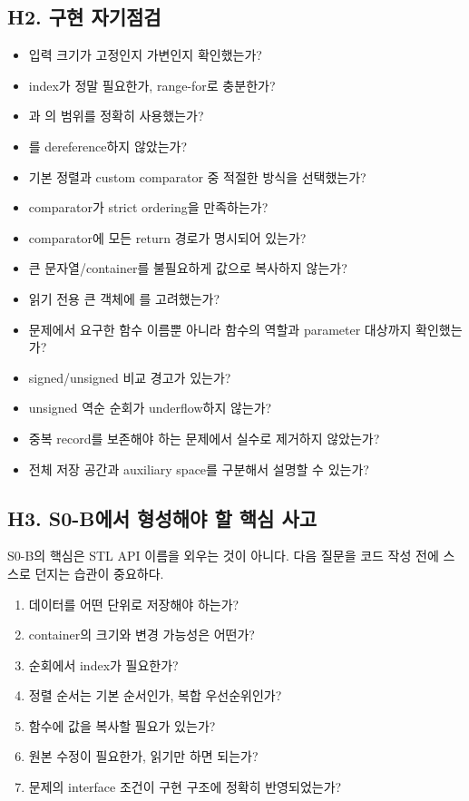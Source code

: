 \subsection{H2. 구현 자기점검}
\begin{checklistbox}[S0-B 코드 작성 후 체크리스트]
\begin{itemize}
  \item[$\square$] 입력 크기가 고정인지 가변인지 확인했는가?
  \item[$\square$] index가 정말 필요한가, range-for로 충분한가?
  \item[$\square$] 과 의 범위를 정확히 사용했는가?
  \item[$\square$] 를 dereference하지 않았는가?
  \item[$\square$] 기본 정렬과 custom comparator 중 적절한 방식을 선택했는가?
  \item[$\square$] comparator가 strict ordering을 만족하는가?
  \item[$\square$] comparator에 모든 return 경로가 명시되어 있는가?
  \item[$\square$] 큰 문자열/container를 불필요하게 값으로 복사하지 않는가?
  \item[$\square$] 읽기 전용 큰 객체에 를 고려했는가?
  \item[$\square$] 문제에서 요구한 함수 이름뿐 아니라 함수의 역할과 parameter 대상까지 확인했는가?
  \item[$\square$] signed/unsigned 비교 경고가 있는가?
  \item[$\square$] unsigned 역순 순회가 underflow하지 않는가?
  \item[$\square$] 중복 record를 보존해야 하는 문제에서 실수로 제거하지 않았는가?
  \item[$\square$] 전체 저장 공간과 auxiliary space를 구분해서 설명할 수 있는가?
\end{itemize}
\end{checklistbox}

\subsection{H3. S0-B에서 형성해야 할 핵심 사고}
S0-B의 핵심은 STL API 이름을 외우는 것이 아니다. 다음 질문을 코드 작성 전에 스스로 던지는 습관이 중요하다.
\begin{enumerate}
  \item 데이터를 어떤 단위로 저장해야 하는가?
  \item container의 크기와 변경 가능성은 어떤가?
  \item 순회에서 index가 필요한가?
  \item 정렬 순서는 기본 순서인가, 복합 우선순위인가?
  \item 함수에 값을 복사할 필요가 있는가?
  \item 원본 수정이 필요한가, 읽기만 하면 되는가?
  \item 문제의 interface 조건이 구현 구조에 정확히 반영되었는가?
\end{enumerate}

